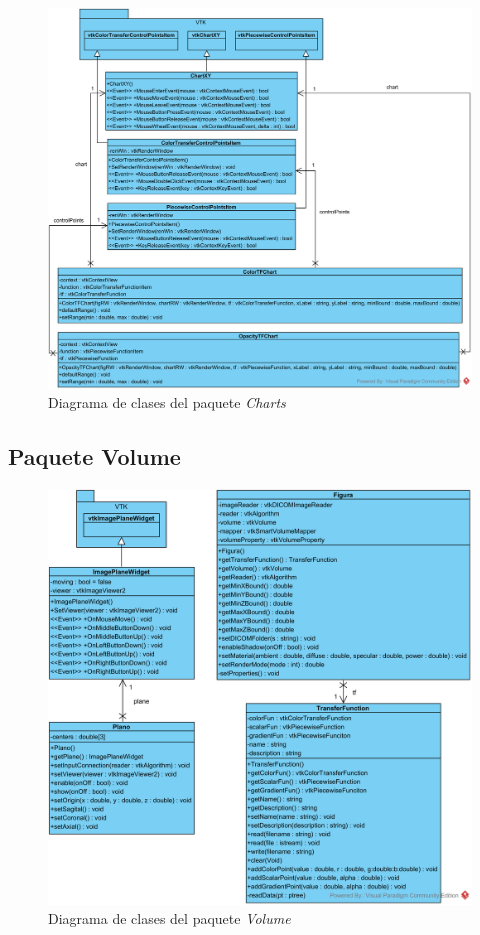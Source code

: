 \begin{figure}[H]
	\centering
	\includegraphics[width=12.5cm]{imagenes/diagramas/charts}
	\caption{Diagrama de clases del paquete \textit{Charts}}
	\label{fig:diagrama_clases_charts}
\end{figure}

\subsection{Paquete Volume}

\begin{figure}[H]
	\centering
	\includegraphics[width=12.5cm]{imagenes/diagramas/volume}
	\caption{Diagrama de clases del paquete \textit{Volume}}
	\label{fig:diagrama_clases_volume}
\end{figure}
